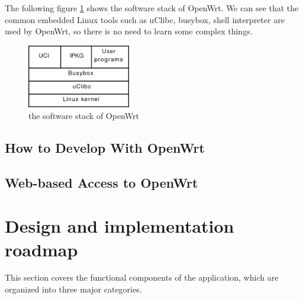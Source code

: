 \documentclass{sig-alternate-05-2015}
\begin{document}
The following figure \ref{OpenWrt:stack} shows the software stack of OpenWrt. We can see that the common embedded Linux tools such as uClibc, busybox, shell interpreter are used by OpenWrt, so there is no need to learn some complex things.

\begin{figure}
	\centering
	\includegraphics[width=0.4\textwidth]{stack.png}
	\caption{the software stack of OpenWrt}
	\label{OpenWrt:stack}
\end{figure}

\subsection{How to Develop With OpenWrt}

\subsection{Web-based Access to OpenWrt}

\section{Design and implementation \\ roadmap}

This section covers the functional components of the application, which are organized into three major categories.
\end{document}
